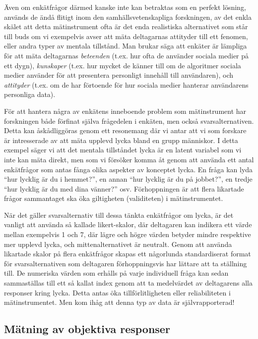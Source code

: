 \documentclass[
]{book}
\begin{document}
Även om enkätfrågor därmed kanske inte kan betraktas som en perfekt lösning, används de ändå flitigt inom den samhällsvetenskapliga forskningen, av det enkla skälet att detta mätinstrument ofta är det enda realistiska alternativet som står till buds om vi exempelvis avser att mäta deltagarnas attityder till ett fenomen, eller andra typer av mentala tillstånd. Man brukar säga att enkäter är lämpliga för att mäta deltagarnas \emph{beteenden} (t.ex. hur ofta de använder sociala medier på ett dygn), \emph{kunskaper} (t.ex. hur mycket de känner till om de algoritmer sociala medier använder för att presentera personligt innehåll till användaren), och \emph{attityder} (t.ex. om de har förtoende för hur sociala medier hanterar användarens personliga data).

För att hantera några av enkätens inneboende problem som mätinstrument har forskningen både förfinat själva frågedelen i enkäten, men också svarsalternativen. Detta kan åskådliggöras genom ett resonemang där vi antar att vi som forskare är intresserade av att mäta upplevd lycka bland en grupp människor. I detta exempel säger vi att det mentala tillståndet lycka är en latent variabel som vi inte kan mäta direkt, men som vi försöker komma åt genom att använda ett antal enkätfrågor som antas fånga olika aspekter av konceptet lycka. En fråga kan lyda ``hur lycklig är du i hemmet?'', en annan ``hur lycklig är du på jobbet?'', en tredje ``hur lycklig är du med dina vänner?'' osv. Förhoppningen är att flera likartade frågor sammantaget ska öka giltigheten (validiteten) i mätinstrumentet.

När det gäller svarsalternativ till dessa tänkta enkätfrågor om lycka, är det vanligt att använda så kallade likert-skalor, där deltagaren kan indikera ett värde mellan exempelvis 1 och 7, där lägre och högre värden betyder mindre respektive mer upplevd lycka, och mittenalternativet är neutralt. Genom att använda likartade skalor på flera enkätfrågor skapas ett någorlunda standardiserat format för svarsalternativen som deltagaren förhoppningsvis har lättare att ta ställning till. De numeriska värden som erhålls på varje individuell fråga kan sedan sammaställas till ett så kallat index genom att ta medelvärdet av deltagarens alla responser kring lycka. Detta antas öka tillförlitligheten eller reliabiliteten i mätinstrumentet. Men kom ihåg att denna typ av data är självrapporterad!

\hypertarget{sub07.3.3}{%
\subsection{Mätning av objektiva responser}\label{sub07.3.3}}
\end{document}
